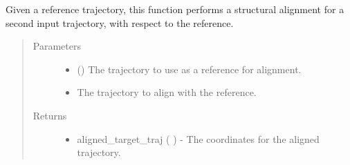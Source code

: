 \documentclass[letterpaper,12pt,english,openany,oneside]{sphinxmanual}
\begin{document}
\begin{fulllineitems}
\label{\detokenize{ensembles:ensembles.cluster.align_structures}}
Given a reference trajectory, this function performs a structural alignment for a second input trajectory, with respect to the reference.
\begin{quote}\begin{description}
\item[{Parameters}] \leavevmode\begin{itemize}
\item {} 
 () \textendash{} The trajectory to use as a reference for alignment.

\item {} 
 \textendash{} The trajectory to align with the reference.

\end{itemize}

\item[{Returns}] \leavevmode
\begin{itemize}
\item {} 
aligned\_target\_traj (  ) - The coordinates for the aligned trajectory.

\end{itemize}


\end{description}\end{quote}

\end{fulllineitems}

\end{document}
